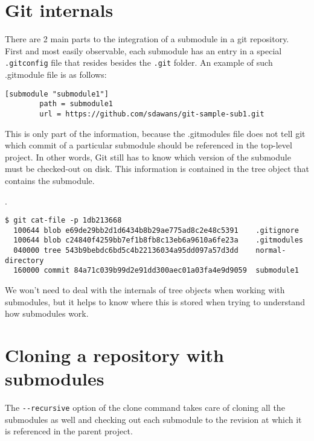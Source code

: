 \documentclass[a4paper]{../../common/tufte-latex/tufte-handout}
\begin{document}
\section{Git internals}

There are 2 main parts to the integration of a submodule in a git repository.
First and most easily observable, each submodule has an entry in a special \texttt{.gitconfig} file that resides besides the \texttt{.git} folder.
An example of such .gitmodule file is as follows:

\begin{lstlisting}[style=BashInputStyle]
[submodule "submodule1"]
        path = submodule1
        url = https://github.com/sdawans/git-sample-sub1.git
\end{lstlisting}

This is only part of the information, because the .gitmodules file does not tell git which commit of a particular submodule should be referenced in the top-level project. In other words, Git still has to know which version of the submodule must be checked-out on disk. This information is contained in the tree object that contains the submodule.

.

\begin{lstlisting}[style=BashInputStyle]
  $ git cat-file -p 1db213668
  100644 blob e69de29bb2d1d6434b8b29ae775ad8c2e48c5391    .gitignore
  100644 blob c24840f4259bb7ef1b8fb8c13eb6a9610a6fe23a    .gitmodules
  040000 tree 543b9bebdc6bd5c4b22136034a95dd097a57d3dd    normal-directory
  160000 commit 84a71c039b99d2e91dd300aec01a03fa4e9d9059  submodule1
\end{lstlisting}

We won't need to deal with the internals of tree objects when working with submodules, but it helps to know where this is stored when trying to understand how submodules work.

\section{Cloning a repository with submodules}

The \texttt{-{}-recursive} option of the clone command takes care of cloning all the submodules as well and checking out each submodule to the revision at which it is referenced in the parent project. 
\end{document}
